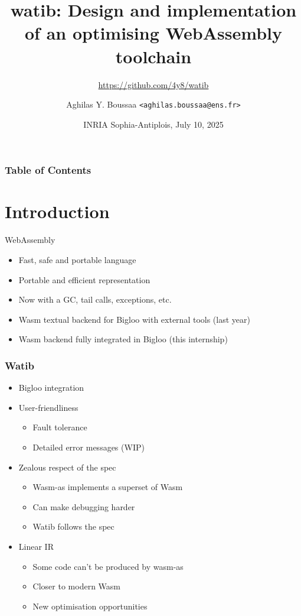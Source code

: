 \documentclass{beamer}
\author{Aghilas Y. Boussaa \texttt{<aghilas.boussaa@ens.fr>}}
\title{watib: Design and implementation of an optimising WebAssembly toolchain}
\subtitle{\url{https://github.com/4y8/watib}}
\institute{École normale supérieure}
\begin{document}
\frame{\titlepage}
\date{INRIA Sophia-Antiplois, July 10, 2025}
\begin{frame}
\frametitle{Table of Contents}
\tableofcontents
\end{frame}

\section{Introduction}
\begin{frame}{WebAssembly}
  \begin{itemize}
    \item Fast, safe and portable language
    \item Portable and efficient representation\pause
    \item Now with a GC, tail calls, exceptions, etc.\pause
    \item Wasm textual backend for Bigloo with external tools (last year)\pause
    \item Wasm backend fully integrated in Bigloo (this internship)
  \end{itemize}
\end{frame}
\begin{frame}
  \frametitle{Watib}
  \begin{itemize}
    \item Bigloo integration\pause
    \item User-friendliness
      \begin{itemize}
        \item Fault tolerance
        \item Detailed error messages (WIP)
      \end{itemize}\pause
    \item Zealous respect of the spec
      \begin{itemize}
        \item Wasm-as implements a superset of Wasm
        \item Can make debugging harder
        \item Watib follows the spec
      \end{itemize}\pause
    \item Linear IR
      \begin{itemize}
        \item Some code can't be produced by wasm-as
        \item Closer to modern Wasm
        \item New optimisation opportunities
      \end{itemize}
  \end{itemize}
\end{frame}
\end{document}

